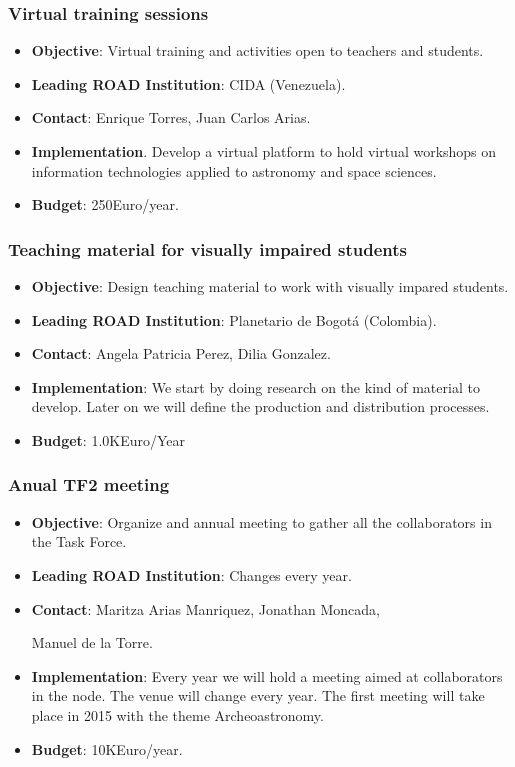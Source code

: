 \documentclass[12pt]{article}
\begin{document}
\subsubsection{Virtual training sessions}
\begin{itemize}
\item {\bf Objective}: Virtual training and activities open to
  teachers and students. 
\item {\bf Leading ROAD Institution}: CIDA (Venezuela).
\item {\bf Contact}: Enrique Torres, Juan Carlos Arias.
\item {\bf Implementation}. Develop a virtual platform to hold virtual
  workshops on information technologies applied to astronomy and space
  sciences.
\item {\bf Budget}: 250Euro/year.
\end{itemize}

\subsubsection{Teaching material for visually impaired students}
\begin{itemize}
\item {\bf Objective}: Design teaching material to work with visually
  impared students. 
\item {\bf Leading ROAD Institution}: Planetario de Bogot\'a
  (Colombia). 
\item {\bf Contact}: Angela Patricia Perez, Dilia Gonzalez. 
\item {\bf Implementation}: We start by doing research on the kind of
  material to develop. Later on we will define the production and
  distribution processes.  
\item {\bf Budget}: 1.0KEuro/Year
\end{itemize}

\subsubsection{Anual TF2 meeting}
\begin{itemize}
\item {\bf Objective}: 
Organize and annual meeting to gather all the
  collaborators in the Task Force.
\item {\bf Leading ROAD Institution}: Changes every year.
\item {\bf Contact}: Maritza Arias Manriquez, Jonathan Moncada, 


Manuel
  de la Torre.
\item {\bf Implementation}: 
Every year we will hold a meeting aimed at collaborators in the
node. The venue will change every year. The first meeting will take
place in 2015 with the theme Archeoastronomy.
\item {\bf Budget}: 10KEuro/year.
\end{itemize}
\end{document}
